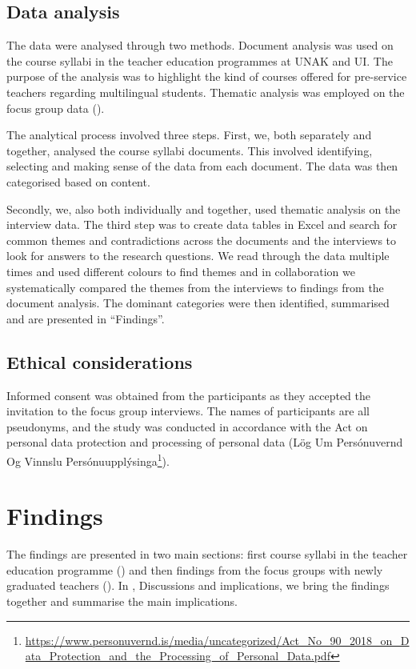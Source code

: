 \documentclass[output=paper]{langscibook}
\begin{document}
\subsection{Data analysis} %

The data were analysed through two methods. Document analysis was used on the course syllabi in the teacher education programmes at UNAK and UI. The purpose of the analysis was to highlight the kind of courses offered for pre-service teachers regarding multilingual students. Thematic analysis was employed on the focus group data (\citealt{BraunClarke2006}).

The analytical process involved three steps. First, we, both separately and together, analysed the course syllabi documents. This involved identifying, selecting and making sense of the data from each document. The data was then categorised based on content.

Secondly, we, also both individually and together, used thematic analysis on the interview data. The third step was to create data tables in Excel and search for common themes and contradictions across the documents and the interviews to look for answers to the research questions. We read through the data multiple times and used different colours to find themes and in collaboration we systematically compared the themes from the interviews to findings from the document analysis. The dominant categories were then identified, summarised and are presented in  “Findings”.

\subsection{Ethical considerations} %

Informed consent was obtained from the participants as they accepted the invitation to the focus group interviews. The names of participants are all pseudonyms, and the study was conducted in accordance with the Act on personal data protection and processing of personal data (Lög Um Persónuvernd Og Vinnslu Persónuupplýsinga\footnote{\url{https://www.personuvernd.is/media/uncategorized/Act_No_90_2018_on_Data_Protection_and_the_Processing_of_Personal_Data.pdf}}). 

\section{Findings}\label{sec:gunnþórsdóttir:5} %

The findings are presented in two main sections: first course syllabi in the teacher education programme () and then findings from the focus groups with newly graduated teachers (). In , Discussions and implications, we bring the findings together and summarise the main implications.
\end{document}
